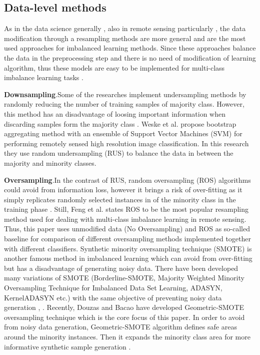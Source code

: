 \documentclass[parskip=full]{scrartcl}
\begin{document}
\subsection{Data-level methods}
As in the data science generally \cite{douzas2019geometric}, also in remote
sensing particularly  \cite{feng2019imbalanced}, the data modification through
a resampling methods are more general and are the most used approaches for
imbalanced learning methods. Since these approaches balance the data in the
preprocessing step and there is no need of modification of learning algorithm,
thus these models are easy to be implemented for multi-class imbalance learning
tasks  \cite{feng2019imbalanced}. 

\textbf{Downsampling}.Some of the researches implement undersampling methods by
randomly reducing the number of training samples of majority class. However,
this method has an disadvantage of loosing important information when discarding
samples form the majority class \cite{feng2019imbalanced}.  Weske et al.
\cite{waske2009classifying} propose bootstrap aggregating method with an
ensemble of Support Vector Machines (SVM) for performing remotely sensed high
resolution image classification. In this research they use random undersampling
(RUS) to balance the data in between the majority and minority classes.

\textbf{Oversampling}.In the contrast of RUS, random oversampling (ROS)
algorithms could avoid from information loss, however it brings a risk of
over-fitting as it simply replicates randomly selected instances in of the
minority class in the training phase \cite{douzas2019geometric}. Still, Feng et
al. \cite{feng2019imbalanced} states ROS to be the most popular resampling
method used for dealing with multi-class imbalance learning in remote sensing.
Thus, this paper uses unmodified data (No Oversampling) and ROS as so-called
baseline for comparison of different oversampling methods implemented together
with different classifiers. Synthetic minority oversampling technique (SMOTE) is
another famous method in imbalanced learning which can avoid from over-fitting
but has a disadvantage of generating noisy data. There have been developed many
variations of SMOTE (Borderline-SMOTE, Majority Weighted Minority Oversampling
Technique for Imbalanced Data Set Learning, ADASYN, KernelADASYN etc.) with the
same objective of preventing noisy data generation \cite{douzas2019geometric},
\cite{feng2019imbalanced}. Recently, Douzas and Bacao have developed
Geometric-SMOTE oversampling technique which is the core focus of this paper. In
order to avoid from noisy data generation, Geometric-SMOTE algorithm defines
safe areas around the minority instances. Then it expands the minority class
area for more informative synthetic sample generation
\cite{douzas2019geometric}. 
\end{document}
